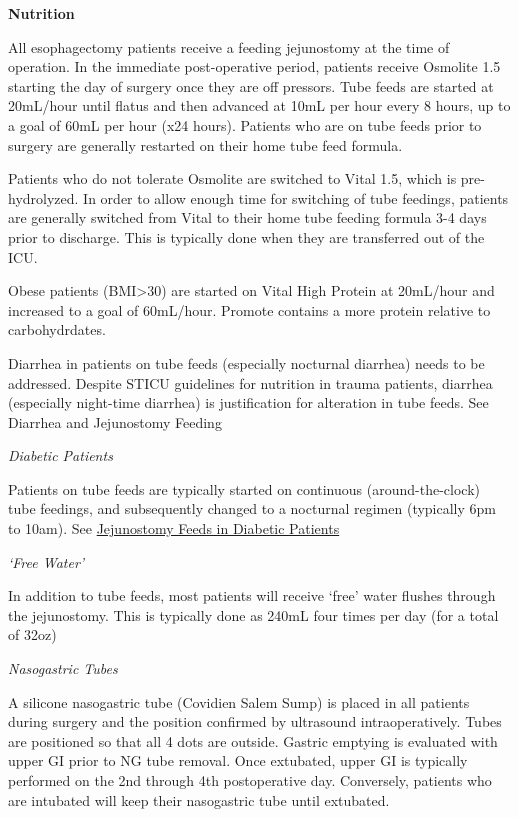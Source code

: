 \documentclass[
  letterpaper,
]{scrbook}
\begin{document}
\textbf{Nutrition}

All esophagectomy patients receive a feeding jejunostomy at the time of
operation. In the immediate post-operative period, patients receive
Osmolite 1.5 starting the day of surgery once they are off pressors.
Tube feeds are started at 20mL/hour until flatus and then advanced at
10mL per hour every 8 hours, up to a goal of 60mL per hour (x24 hours).
Patients who are on tube feeds prior to surgery are generally restarted
on their home tube feed formula.

Patients who do not tolerate Osmolite are switched to Vital 1.5, which
is pre-hydrolyzed. In order to allow enough time for switching of tube
feedings, patients are generally switched from Vital to their home tube
feeding formula 3-4 days prior to discharge. This is typically done when
they are transferred out of the ICU.

Obese patients (BMI\textgreater30) are started on Vital High Protein at
20mL/hour and increased to a goal of 60mL/hour. Promote contains a more
protein relative to carbohydrdates.

Diarrhea in patients on tube feeds (especially nocturnal diarrhea) needs
to be addressed. Despite STICU guidelines for nutrition in trauma
patients, diarrhea (especially night-time diarrhea) is justification for
alteration in tube feeds. See Diarrhea and Jejunostomy Feeding

\emph{Diabetic Patients}

Patients on tube feeds are typically started on continuous
(around-the-clock) tube feedings, and subsequently changed to a
nocturnal regimen (typically 6pm to 10am). See
\hyperref[jejunostomy_diabetes]{Jejunostomy Feeds in Diabetic Patients}

\emph{`Free Water'}

In addition to tube feeds, most patients will receive `free' water
flushes through the jejunostomy. This is typically done as 240mL four
times per day (for a total of 32oz)

\emph{Nasogastric Tubes}

A silicone nasogastric tube (Covidien Salem Sump) is placed in all
patients during surgery and the position confirmed by ultrasound
intraoperatively. Tubes are positioned so that all 4 dots are outside.
Gastric emptying is evaluated with upper GI prior to NG tube removal.
Once extubated, upper GI is typically performed on the 2nd through 4th
postoperative day. Conversely, patients who are intubated will keep
their nasogastric tube until extubated.
\end{document}
